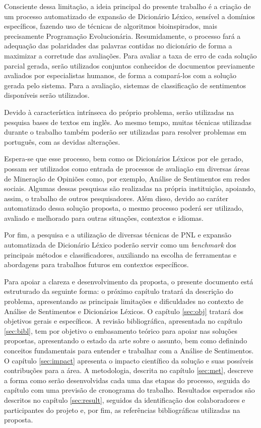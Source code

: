 \documentclass[a4paper,11pt]{article}
\begin{document}
Consciente dessa limitação, a ideia principal do presente trabalho é a criação de um processo automatizado de expansão de Dicionário Léxico, sensível a domínios específicos, fazendo uso de técnicas de algoritmos bioinspirados, mais precisamente Programação Evolucionária. Resumidamente, o processo fará a adequação das polaridades das palavras contidas no dicionário de forma a maximizar a corretude das avaliações. Para avaliar a taxa de erro de cada solução parcial gerada, serão utilizados conjuntos conhecidos de documentos previamente avaliados por especialistas humanos, de forma a compará-los com a solução gerada pelo sistema. Para a avaliação, sistemas de classificação de sentimentos disponíveis serão utilizados.

Devido à característica intrínseca do próprio problema, serão utilizadas na pesquisa bases de textos em inglês. Ao mesmo tempo, muitas técnicas utilizadas durante o trabalho também poderão ser utilizadas para resolver problemas em português, com as devidas alterações. 

Espera-se que esse processo, bem como os Dicionários Léxicos por ele gerado, possam ser utilizados como entrada de processos de avaliação em diversas áreas de Mineração de Opiniões como, por exemplo, Análise de Sentimentos em redes sociais. Algumas dessas pesquisas são realizadas na própria instituição, apoiando, assim, o trabalho de outros pesquisadores. Além disso, devido ao caráter automatizado dessa solução proposta, o mesmo processo poderá ser utilizado, avaliado e melhorado para outras situações, contextos e idiomas.

Por fim, a pesquisa e a utilização de diversas técnicas de PNL e expansão automatizada de Dicionário Léxico poderão servir como um \emph{benchmark} dos principais métodos e classificadores, auxiliando na escolha de ferramentas e abordagens para trabalhos futuros em contextos específicos.

Para apoiar a clareza e desenvolvimento da proposta, o presente documento está estruturado da seguinte forma: o próximo capítulo tratará da descrição do problema, apresentando as principais limitações e dificuldades no contexto de Análise de Sentimentos e Dicionários Léxicos. O capítulo \ref{sec:obj} tratará dos objetivos gerais e específicos. A revisão bibliográfica, apresentada no capítulo \ref{sec:bibl}, tem por objetivo o embasamento teórico para apoiar nas soluções propostas, apresentando o estado da arte sobre o assunto, bem como definindo conceitos fundamentais para entender e trabalhar com a Análise de Sentimentos. O capítulo \ref{sec:impact} apresenta o impacto científico da solução e suas possíveis contribuções para a área. A metodologia, descrita no capítulo \ref{sec:met}, descreve a forma como serão desenvolvidas cada uma das etapas do processo, seguida do capítulo com uma previsão de cronograma do trabalho. Resultados esperados são descritos no capítulo \ref{sec:result}, seguidos da identificação dos colaboradores e participantes do projeto e, por fim, as referências bibliográficas utilizadas na proposta.
\end{document}
